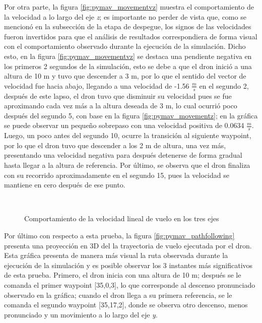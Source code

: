 Por otra parte, la figura \ref{fig:pymav_movementvz} muestra el comportamiento de la velocidad a lo largo del eje \textit{z}; es importante no perder de vista que, como se mencionó en la subsección de la etapa de despegue, los signos de las velocidades fueron invertidos para que el análisis de resultados correspondiera de forma visual con el comportamiento observado durante la ejecución de la simulación. Dicho esto, en la figura \ref{fig:pymav_movementvz} se destaca una pendiente negativa en los primeros 2 segundos de la simulación, esto se debe a que el dron inició a una altura de 10 m y tuvo que descender a 3 m, por lo que el sentido del vector de velocidad fue hacia abajo, llegando a una velocidad de -1.56 $\frac{m}{s}$ en el segundo 2, después de este lapso, el dron tuvo que disminuir su velocidad pues se fue aproximando cada vez más a la altura deseada de 3 m, lo cual ocurrió poco después del segundo 5, con base en la figura \ref{fig:pymav_movementz}; en la gráfica se puede observar un pequeño sobrepaso con una velocidad positiva de 0.0634 $\frac{m}{s}$. Luego, un poco antes del segundo 10, ocurre la transición al siguiente waypoint, por lo que el dron tuvo que descender a los 2 m de altura, una vez más, presentando una velocidad negativa para después detenerse de forma gradual hasta llegar a la altura de referencia. Por último, se observa que el dron finaliza con su recorrido aproximadamente en el segundo 15, pues la velocidad se mantiene en cero después de ese punto.

\begin{figure}[ht]
    \centering
    \hfill
    \\
    \hfill

    \caption{Comportamiento de la velocidad lineal de vuelo en los tres ejes}
    \label{fig:pymav_movementv}
\end{figure}

Por último con respecto a esta prueba, la figura \ref{fig:pymav_pathfollowing} presenta una proyección en 3D del la trayectoria de vuelo ejecutada por el dron. Esta gráfica presenta de manera más visual la ruta observada durante la ejecución de la simulación y es posible observar los 3 instantes más significativos de esta prueba. Primero, el dron inicia con una altura de 10 m; después se le comanda el primer waypoint [35,0,3], lo que corresponde al descenso pronunciado observado en la gráfica; cuando el dron llega a su primera referencia, se le comanda el segundo waypoint [35,17,2], donde se observa otro descenso, menos pronunciado y un movimiento a lo largo del eje \textit{y}.

